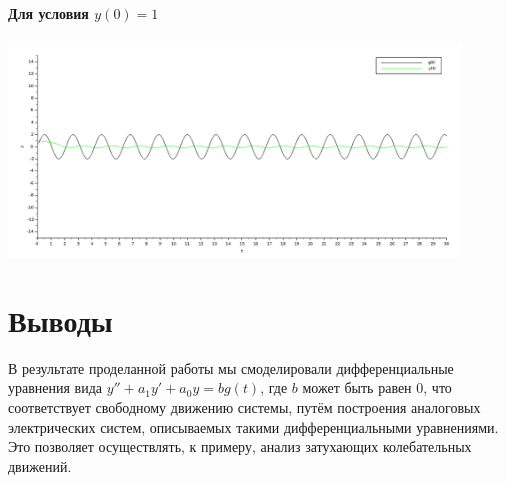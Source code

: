 \documentclass[12pt, a4paper] {ncc}
\begin{document}
\paragraph{Для условия $y(0) = 1$}
\begin{center}
\includegraphics[width=0.9\textwidth]{3g1.png}
\end{center}



\section{Выводы}

В результате проделанной работы мы смоделировали дифференциальные уравнения вида
$y'' + a_1 y' + a_0 y = bg(t)$, где $b$ может быть равен $0$, что соответствует
свободному движению системы, путём построения аналоговых электрических систем,
описываемых такими дифференциальными уравнениями. Это позволяет осуществлять, к
примеру, анализ затухающих колебательных движений.
\end{document}
